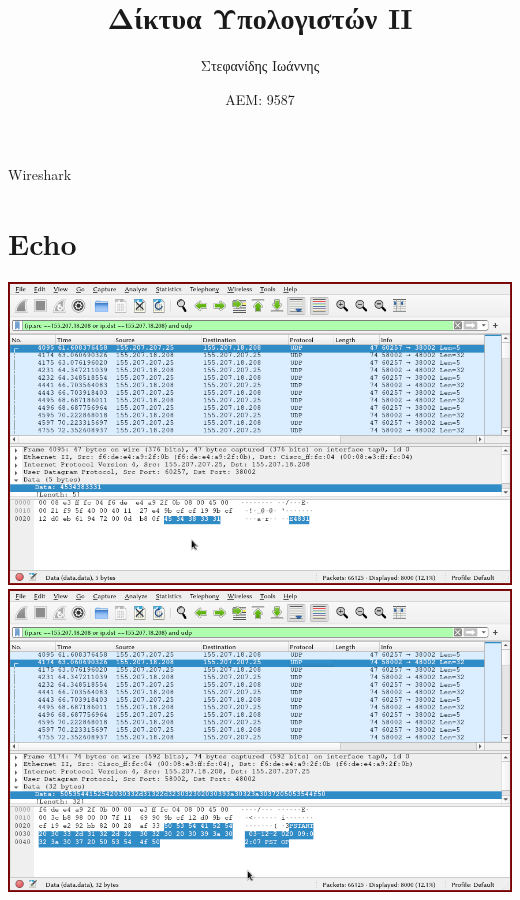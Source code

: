 \documentclass{article}
\author{Στεφανίδης Ιωάννης}
\title{Δίκτυα Υπολογιστών ΙΙ}
\date{ΑΕΜ: 9587}
\begin{document}
\maketitle

\center
{\huge{Wireshark}}

\section{Echo}
\includegraphics[width=\textwidth]{wireshark1.png}
\includegraphics[width=\textwidth]{wireshark2.png}
\end{document}
